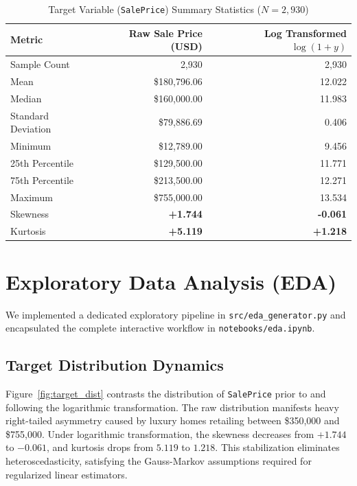\documentclass[11pt,a4paper]{article}
\begin{document}
\begin{table}[H]
\centering
\caption{Target Variable (\texttt{SalePrice}) Summary Statistics ($N = 2,930$)}
\label{tab:target_stats}
\begin{tabular}{lrr}
\toprule
\textbf{Metric} & \textbf{Raw Sale Price (USD)} & \textbf{Log Transformed $\log(1 + y)$} \\
\midrule
Sample Count       & 2,930               & 2,930           \\
Mean               & \$180,796.06        & 12.022          \\
Median             & \$160,000.00        & 11.983          \\
Standard Deviation & \$79,886.69         & 0.406           \\
Minimum            & \$12,789.00         & 9.456           \\
25th Percentile    & \$129,500.00        & 11.771          \\
75th Percentile    & \$213,500.00        & 12.271          \\
Maximum            & \$755,000.00        & 13.534          \\
Skewness           & \textbf{+1.744}     & \textbf{-0.061} \\
Kurtosis           & \textbf{+5.119}     & \textbf{+1.218} \\
\bottomrule
\end{tabular}
\end{table}

\section{Exploratory Data Analysis (EDA)}
We implemented a dedicated exploratory pipeline in \texttt{src/eda\_generator.py} and encapsulated the complete interactive workflow in \texttt{notebooks/eda.ipynb}.

\subsection{Target Distribution Dynamics}
Figure~\ref{fig:target_dist} contrasts the distribution of \texttt{SalePrice} prior to and following the logarithmic transformation. The raw distribution manifests heavy right-tailed asymmetry caused by luxury homes retailing between \$350,000 and \$755,000. Under logarithmic transformation, the skewness decreases from $+1.744$ to $-0.061$, and kurtosis drops from $5.119$ to $1.218$. This stabilization eliminates heteroscedasticity, satisfying the Gauss-Markov assumptions required for regularized linear estimators.
\end{document}
